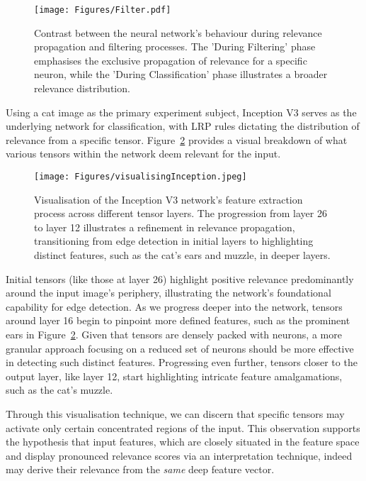 \begin{figure}[ht!]
\begin{center}
\texttt{[image: Figures/Filter.pdf]}
\end{center}
\caption{Contrast between the neural network's behaviour during relevance propagation and filtering processes. The 'During Filtering' phase emphasises the exclusive propagation of relevance for a specific neuron, while the 'During Classification' phase illustrates a broader relevance distribution.}
\label{fig:filter}
\end{figure}
Using a cat image as the primary experiment subject, Inception V3 serves as the underlying network for classification, with LRP rules dictating the distribution of relevance from a specific tensor. Figure~\ref{fig:visualizing} provides a visual breakdown of what various tensors within the network deem relevant for the input.
\begin{figure}[ht!]
\begin{center}
\texttt{[image: Figures/visualisingInception.jpeg]}
\end{center}
\caption{Visualisation of the Inception V3 network's feature extraction process across different tensor layers. The progression from layer 26 to layer 12 illustrates a refinement in relevance propagation, transitioning from edge detection in initial layers to highlighting distinct features, such as the cat's ears and muzzle, in deeper layers.}
\label{fig:visualizing}
\end{figure}
Initial tensors (like those at layer 26) highlight positive relevance predominantly around the input image's periphery, illustrating the network's foundational capability for edge detection. As we progress deeper into the network, tensors around layer 16 begin to pinpoint more defined features, such as the prominent ears in Figure~\ref{fig:visualizing}. Given that tensors are densely packed with neurons, a more granular approach focusing on a reduced set of neurons should be more effective in detecting such distinct features. Progressing even further, tensors closer to the output layer, like layer 12, start highlighting intricate feature amalgamations, such as the cat's muzzle.


Through this visualisation technique, we can discern that specific tensors may activate only certain concentrated regions of the input. This observation supports the hypothesis that input features, which are closely situated in the feature space and display pronounced relevance scores via an interpretation technique, indeed may derive their relevance from the \textit{same} deep feature vector.

